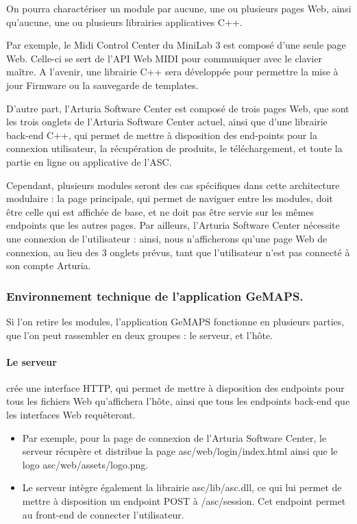 \documentclass[francais]{rapportPFE}  %
\begin{document}
On pourra charactériser un module par aucune, une ou plusieurs pages Web, ainsi qu'aucune, une ou plusieurs librairies applicatives C++.

Par exemple, le Midi Control Center du MiniLab 3 est composé d'une seule page Web. Celle-ci se sert de l'API Web MIDI pour communiquer avec le clavier maître. A l'avenir, une librairie C++ sera développée pour permettre la mise à jour Firmware ou la sauvegarde de templates.

D'autre part, l'Arturia Software Center est composé de trois pages Web, que sont les trois onglets de l'Arturia Software Center actuel, ainsi que d'une librairie back-end C++, qui permet de mettre à disposition des end-points pour la connexion utilisateur, la récupération de produits, le téléchargement, et toute la partie en ligne ou applicative de l'ASC.

Cependant, plusieurs modules seront des cas spécifiques dans cette architecture modulaire :
la page principale, qui permet de naviguer entre les modules, doit être celle qui est affichée de base, et ne doit pas être servie sur les mêmes endpoints que les autres pages.
Par ailleurs, l'Arturia Software Center nécessite une connexion de l'utilisateur : ainsi, nous n'afficherons qu'une page Web de connexion, au lieu des 3 onglets prévus, tant que l'utilisateur n'est pas connecté à son compte Arturia.



\subsubsection{Environnement technique de l'application GeMAPS.}

Si l'on retire les modules, l'application GeMAPS fonctionne en plusieurs parties, que l'on peut rassembler en deux groupes : le serveur, et l'hôte.

\paragraph{Le serveur} crée une interface HTTP, qui permet de mettre à disposition des endpoints pour tous les fichiers Web qu'affichera l'hôte, ainsi que tous les endpoints back-end que les interfaces Web requêteront.
\begin{itemize}
    \item Par exemple, pour la page de connexion de l'Arturia Software Center, le serveur récupère et distribue la page asc/web/login/index.html ainsi que le logo asc/web/assets/logo.png. 
    \item Le serveur intègre également la librairie asc/lib/asc.dll, ce qui lui permet de mettre à disposition un endpoint POST à /asc/session. Cet endpoint permet au front-end de connecter l'utilisateur.
\end{itemize}
\end{document}
